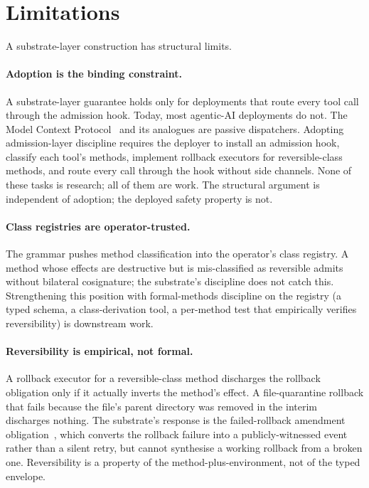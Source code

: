\section{Limitations}
\label{sec:limitations}

A substrate-layer construction has structural limits.

\paragraph{Adoption is the binding constraint.}
A substrate-layer guarantee holds only for deployments that route every tool call through the admission hook. Today, most agentic-AI deployments do not. The Model Context Protocol~\cite{anthropicMCP2024} and its analogues are passive dispatchers. Adopting admission-layer discipline requires the deployer to install an admission hook, classify each tool's methods, implement rollback executors for reversible-class methods, and route every call through the hook without side channels. None of these tasks is research; all of them are work. The structural argument is independent of adoption; the deployed safety property is not.

\paragraph{Class registries are operator-trusted.}
The grammar pushes method classification into the operator's class registry. A method whose effects are destructive but is mis-classified as reversible admits without bilateral cosignature; the substrate's discipline does not catch this. Strengthening this position with formal-methods discipline on the registry (a typed schema, a class-derivation tool, a per-method test that empirically verifies reversibility) is downstream work.

\paragraph{Reversibility is empirical, not formal.}
A rollback executor for a reversible-class method discharges the rollback obligation only if it actually inverts the method's effect. A file-quarantine rollback that fails because the file's parent directory was removed in the interim discharges nothing. The substrate's response is the failed-rollback amendment obligation~\cite{programmableSovereignty2026}, which converts the rollback failure into a publicly-witnessed event rather than a silent retry, but cannot synthesise a working rollback from a broken one. Reversibility is a property of the method-plus-environment, not of the typed envelope.

